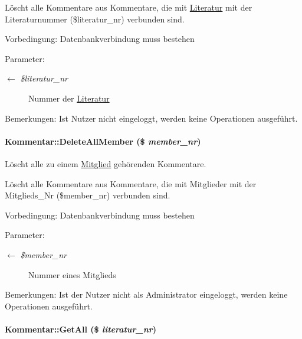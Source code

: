 Löscht alle Kommentare aus Kommentare, die mit \hyperlink{classLiteratur}{Literatur} mit der Literaturnummer (\$literatur\_\-nr) verbunden sind. \begin{Desc}
\item[Vorbedingung:]Datenbankverbindung muss bestehen \end{Desc}
\begin{Desc}
\item[Parameter:]
\begin{description}
\item[\mbox{$\leftarrow$} {\em \$literatur\_\-nr}]Nummer der \hyperlink{classLiteratur}{Literatur} \end{description}
\end{Desc}
\begin{Desc}
\item[Bemerkungen:]Ist Nutzer nicht eingeloggt, werden keine Operationen ausgeführt. \end{Desc}
\hypertarget{classKommentar_92a8fcea1b065341c7c53e8a8464fcf0}{
\paragraph[DeleteAllMember]{\setlength{\rightskip}{0pt plus 5cm}Kommentar::Delete\-All\-Member (\$ {\em member\_\-nr})}\hfill}
\label{classKommentar_92a8fcea1b065341c7c53e8a8464fcf0}


Löscht alle zu einem \hyperlink{classMitglied}{Mitglied} gehörenden Kommentare. 

Löscht alle Kommentare aus Kommentare, die mit Mitglieder mit der Mitglieds\_\-Nr (\$member\_\-nr) verbunden sind. \begin{Desc}
\item[Vorbedingung:]Datenbankverbindung muss bestehen \end{Desc}
\begin{Desc}
\item[Parameter:]
\begin{description}
\item[\mbox{$\leftarrow$} {\em \$member\_\-nr}]Nummer eines Mitglieds \end{description}
\end{Desc}
\begin{Desc}
\item[Bemerkungen:]Ist der Nutzer nicht als Administrator eingeloggt, werden keine Operationen ausgeführt. \end{Desc}
\hypertarget{classKommentar_33d65db8c526c50017a5fa029bc04416}{
\paragraph[GetAll]{\setlength{\rightskip}{0pt plus 5cm}Kommentar::Get\-All (\$ {\em literatur\_\-nr})}\hfill}
\label{classKommentar_33d65db8c526c50017a5fa029bc04416}


